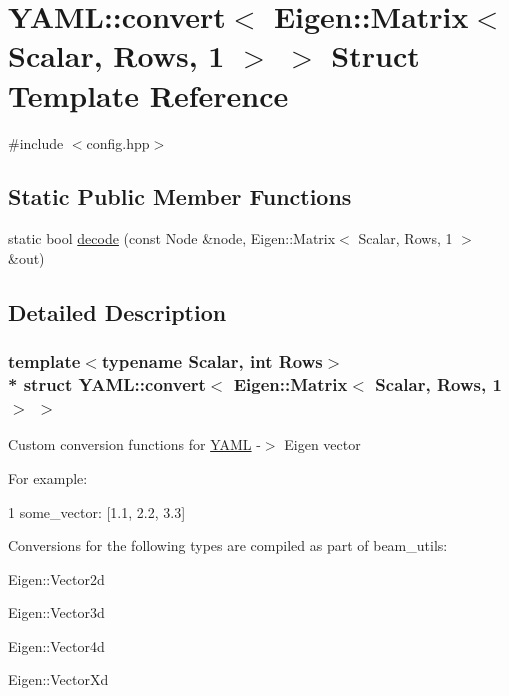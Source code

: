 \hypertarget{struct_y_a_m_l_1_1convert_3_01_eigen_1_1_matrix_3_01_scalar_00_01_rows_00_011_01_4_01_4}{}\section{Y\+A\+ML\+:\+:convert$<$ Eigen\+:\+:Matrix$<$ Scalar, Rows, 1 $>$ $>$ Struct Template Reference}
\label{struct_y_a_m_l_1_1convert_3_01_eigen_1_1_matrix_3_01_scalar_00_01_rows_00_011_01_4_01_4}


{\ttfamily \#include $<$config.\+hpp$>$}

\subsection*{Static Public Member Functions}
\begin{DoxyCompactItemize}
\item 
static bool \hyperlink{struct_y_a_m_l_1_1convert_3_01_eigen_1_1_matrix_3_01_scalar_00_01_rows_00_011_01_4_01_4_ab055b0f7ee0b46864b1df4692e3a0050}{decode} (const Node \&node, Eigen\+::\+Matrix$<$ Scalar, Rows, 1 $>$ \&out)
\end{DoxyCompactItemize}


\subsection{Detailed Description}
\subsubsection*{template$<$typename Scalar, int Rows$>$\\*
struct Y\+A\+M\+L\+::convert$<$ Eigen\+::\+Matrix$<$ Scalar, Rows, 1 $>$ $>$}

Custom conversion functions for \hyperlink{namespace_y_a_m_l}{Y\+A\+ML} -\/$>$ Eigen vector

For example\+: 
\begin{DoxyCode}
1 some\_vector: [1.1, 2.2, 3.3]
\end{DoxyCode}


Conversions for the following types are compiled as part of beam\+\_\+utils\+:
\begin{DoxyItemize}
\item Eigen\+::\+Vector2d
\item Eigen\+::\+Vector3d
\item Eigen\+::\+Vector4d
\item Eigen\+::\+Vector\+Xd 
\end{DoxyItemize}


